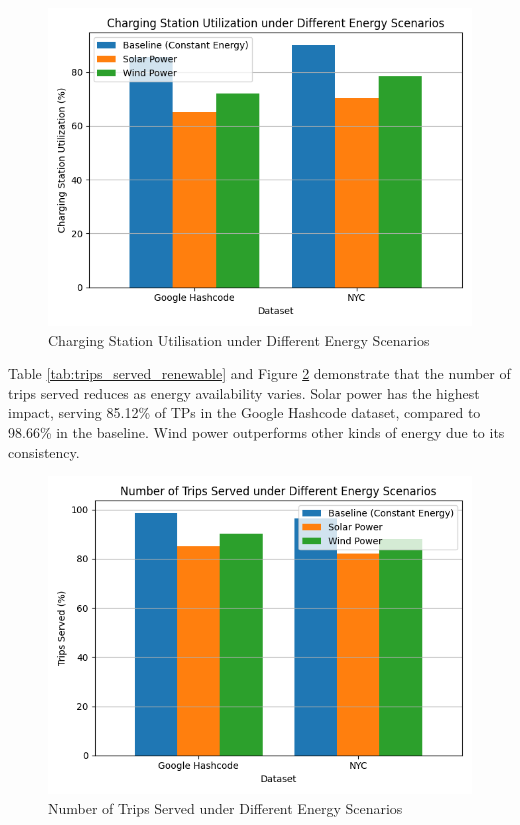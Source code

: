\begin{figure}[htbp]
\centering
\includegraphics[scale=0.55]{Crest/Images/charging_utilization.png}
\caption{Charging Station Utilisation under Different Energy Scenarios}
\label{fig:charging_utilization}
\end{figure}

Table \ref{tab:trips_served_renewable} and Figure \ref{fig:trips_served_renewable} demonstrate that the number of trips served reduces as energy availability varies. Solar power has the highest impact, serving 85.12\% of TPs in the Google Hashcode dataset, compared to 98.66\% in the baseline. Wind power outperforms other kinds of energy due to its consistency.

\begin{figure}[htbp]
\centering
\includegraphics[scale=0.55]{Crest/Images/trips_served_renewable.png}
\caption{Number of Trips Served under Different Energy Scenarios}
\label{fig:trips_served_renewable}
\end{figure}

